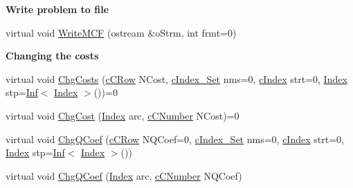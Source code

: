 \begin{Indent}\textbf{ Write problem to file}\par
\begin{DoxyCompactItemize}
\item 
virtual void \mbox{\hyperlink{class_m_c_f_class_acd008d9548bf3e1aef1291864171bb2d}{Write\+M\+CF}} (ostream \&o\+Strm, int frmt=0)
\end{DoxyCompactItemize}
\end{Indent}
\begin{Indent}\textbf{ Changing the costs}\par
\begin{DoxyCompactItemize}
\item 
virtual void \mbox{\hyperlink{class_m_c_f_class_aedaaa3c7820183c210ff8b1cc716c27d}{Chg\+Costs}} (\mbox{\hyperlink{class_m_c_f_class_ab700102e9ba8bb6015be6818d4e99097}{c\+C\+Row}} N\+Cost, \mbox{\hyperlink{class_m_c_f_class_a81575b2d4e4d5636b17170432150ae69}{c\+Index\+\_\+\+Set}} nms=0, \mbox{\hyperlink{class_m_c_f_class_a76aaabb20535c51a2752b93f6c38fe54}{c\+Index}} strt=0, \mbox{\hyperlink{class_m_c_f_class_ad53d6229d7ec28555a9c9c2fd9abf773}{Index}} stp=\mbox{\hyperlink{class_o_p_ttypes__di__unipi__it_1_1_inf}{Inf}}$<$ \mbox{\hyperlink{class_m_c_f_class_ad53d6229d7ec28555a9c9c2fd9abf773}{Index}} $>$())=0
\item 
virtual void \mbox{\hyperlink{class_m_c_f_class_a41ab6d76a454b3f792665cce35a250f3}{Chg\+Cost}} (\mbox{\hyperlink{class_m_c_f_class_ad53d6229d7ec28555a9c9c2fd9abf773}{Index}} arc, \mbox{\hyperlink{class_m_c_f_class_a07dbefeeb08c3f63073622411893eb76}{c\+C\+Number}} N\+Cost)=0
\item 
virtual void \mbox{\hyperlink{class_m_c_f_class_a4aa1d49c3edafbf4783d579d175070fd}{Chg\+Q\+Coef}} (\mbox{\hyperlink{class_m_c_f_class_ab700102e9ba8bb6015be6818d4e99097}{c\+C\+Row}} N\+Q\+Coef=0, \mbox{\hyperlink{class_m_c_f_class_a81575b2d4e4d5636b17170432150ae69}{c\+Index\+\_\+\+Set}} nms=0, \mbox{\hyperlink{class_m_c_f_class_a76aaabb20535c51a2752b93f6c38fe54}{c\+Index}} strt=0, \mbox{\hyperlink{class_m_c_f_class_ad53d6229d7ec28555a9c9c2fd9abf773}{Index}} stp=\mbox{\hyperlink{class_o_p_ttypes__di__unipi__it_1_1_inf}{Inf}}$<$ \mbox{\hyperlink{class_m_c_f_class_ad53d6229d7ec28555a9c9c2fd9abf773}{Index}} $>$())
\item 
virtual void \mbox{\hyperlink{class_m_c_f_class_a4df44e18d436b2500e5608d6ab2d58ad}{Chg\+Q\+Coef}} (\mbox{\hyperlink{class_m_c_f_class_ad53d6229d7ec28555a9c9c2fd9abf773}{Index}} arc, \mbox{\hyperlink{class_m_c_f_class_a07dbefeeb08c3f63073622411893eb76}{c\+C\+Number}} N\+Q\+Coef)
\end{DoxyCompactItemize}
\end{Indent}
